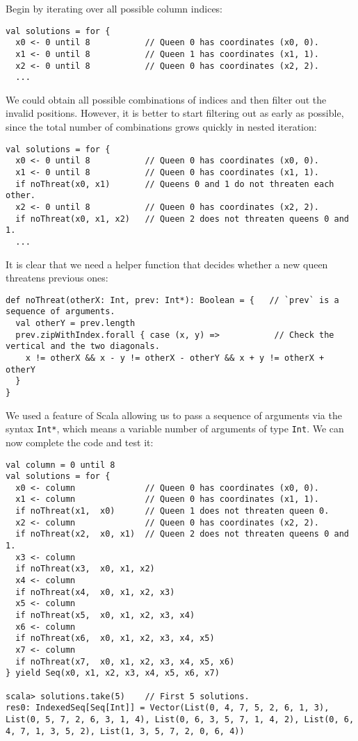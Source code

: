 Begin by iterating over all possible column indices:
\begin{lstlisting}
val solutions = for {
  x0 <- 0 until 8           // Queen 0 has coordinates (x0, 0).
  x1 <- 0 until 8           // Queen 1 has coordinates (x1, 1).
  x2 <- 0 until 8           // Queen 0 has coordinates (x2, 2).
  ...
\end{lstlisting}
We could obtain all possible combinations of indices and then filter
out the invalid positions. However, it is better to start filtering
out as early as possible, since the total number of combinations grows
quickly in nested iteration:
\begin{lstlisting}
val solutions = for {
  x0 <- 0 until 8           // Queen 0 has coordinates (x0, 0).
  x1 <- 0 until 8           // Queen 0 has coordinates (x1, 1).
  if noThreat(x0, x1)       // Queens 0 and 1 do not threaten each other.
  x2 <- 0 until 8           // Queen 0 has coordinates (x2, 2).
  if noThreat(x0, x1, x2)   // Queen 2 does not threaten queens 0 and 1.
  ...
\end{lstlisting}
It is clear that we need a helper function that decides whether a
new queen threatens previous ones:
\begin{lstlisting}
def noThreat(otherX: Int, prev: Int*): Boolean = {   // `prev` is a sequence of arguments.
  val otherY = prev.length
  prev.zipWithIndex.forall { case (x, y) =>           // Check the vertical and the two diagonals.
    x != otherX && x - y != otherX - otherY && x + y != otherX + otherY
  }
}
\end{lstlisting}
We used a feature of Scala allowing us to pass a sequence of arguments
via the syntax \lstinline!Int*!, which means a variable number of
arguments of type \lstinline!Int!. We can now complete the code and
test it:
\begin{lstlisting}
val column = 0 until 8
val solutions = for {
  x0 <- column              // Queen 0 has coordinates (x0, 0).
  x1 <- column              // Queen 0 has coordinates (x1, 1).
  if noThreat(x1,  x0)      // Queen 1 does not threaten queen 0.
  x2 <- column              // Queen 0 has coordinates (x2, 2).
  if noThreat(x2,  x0, x1)  // Queen 2 does not threaten queens 0 and 1.
  x3 <- column
  if noThreat(x3,  x0, x1, x2)
  x4 <- column
  if noThreat(x4,  x0, x1, x2, x3)
  x5 <- column
  if noThreat(x5,  x0, x1, x2, x3, x4)
  x6 <- column
  if noThreat(x6,  x0, x1, x2, x3, x4, x5)
  x7 <- column
  if noThreat(x7,  x0, x1, x2, x3, x4, x5, x6)
} yield Seq(x0, x1, x2, x3, x4, x5, x6, x7)

scala> solutions.take(5)    // First 5 solutions.
res0: IndexedSeq[Seq[Int]] = Vector(List(0, 4, 7, 5, 2, 6, 1, 3), List(0, 5, 7, 2, 6, 3, 1, 4), List(0, 6, 3, 5, 7, 1, 4, 2), List(0, 6, 4, 7, 1, 3, 5, 2), List(1, 3, 5, 7, 2, 0, 6, 4))
\end{lstlisting}


